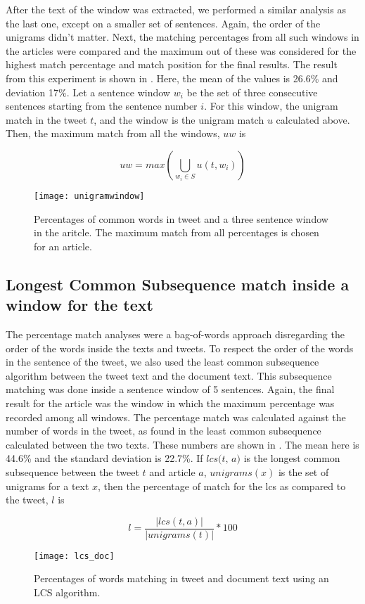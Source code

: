 After the text of the window was extracted, we performed a similar analysis as the last one, except on a smaller set of sentences. Again, the order of the unigrams didn't matter. Next, the matching percentages from all such windows in the articles were compared and the maximum out of these was considered for the highest match percentage and match position for the final results. The result from this experiment is shown in . Here, the mean of the values is 26.6\% and deviation 17\%. Let a sentence window $w_i$ be the set of three consecutive sentences starting from the sentence number $i$. For this window, the unigram match in the tweet $t$, and the window is the unigram match $u$ calculated above. Then, the maximum match from all the windows, $uw$ is 

\begin{equation}
uw = max \left( \bigcup_{w_i \in S} u \left( t, w_i \right) \right)
\end{equation}

\begin{figure}[htbp]
\centering
\texttt{[image: unigramwindow]}
\caption{Percentages of common words in tweet and a three sentence window in the aritcle. The maximum match from all percentages is chosen for an article.}
\label{fig:unigramwindow}
\end{figure}

\subsection{Longest Common Subsequence match inside a window for the text}

The percentage match analyses were a bag-of-words approach disregarding the order of the words inside the texts and tweets. To respect the order of the words in the sentence of the tweet, we also used the least common subsequence algorithm between the tweet text and the document text. This subsequence matching was done inside a sentence window of 5 sentences. Again, the final result for the article was the window in which the maximum percentage was recorded among all windows. The percentage match was calculated against the number of words in the tweet, as found in the least common subsequence calculated between the two texts. These numbers are shown in . The mean here is 44.6\% and the standard deviation is 22.7\%. If $\textit{lcs(t, a)}$ is the longest common subsequence between the tweet $t$ and article $a$, $\textit{unigrams}(x)$ is the set of unigrams for a text $x$, then the percentage of match for the lcs as compared to the tweet, $\textit{l}$ is

\begin{equation}
l = \frac{| lcs(t, a) |}{| unigrams(t) |} * 100
\end{equation}

\begin{figure}[htbp]
\centering
\texttt{[image: lcs\_doc]}
\caption{Percentages of words matching in tweet and document text using an LCS algorithm.}
\label{fig:lcs}
\end{figure}